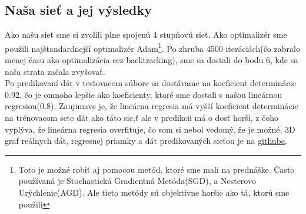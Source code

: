 \documentclass{article}
\begin{document}
\subsection{Naša sieť a jej výsledky}
Ako našu sieť sme si zvolili plne spojenú 4 stupňovú sieť. Ako optimalizér sme použili najštandardnejší optimalizér Adam\footnote{Toto je možné robiť aj pomocou metód, ktoré sme mali na prednáške. Často používaná je Stochastická Gradientná Metóda(SGD), a Nesterovo Urýchlenie(AGD). Ale tieto metódy sú objektívne horšie ako tá, ktorú sme použili}. Po zhruba 4500 iteráciách(čo zabralo menej času ako optimalizácia cez backtracking), sme sa dostali do bodu 6, kde sa naša strata začala zvyšovať.\\
Po predikovaní dát v testovacom súbore sa dostávame na koeficient determinácie 0.92, čo je omnoho lepšie ako koeficienty, ktoré sme dostali s našou lineárnou regresiou(0.8). Zaujimave je, že lineárna regresia má vyšší koeficient determinácie na trénovacom sete dát ako táto sie,ť ale v predikcii má o dosť horší, z čoho vyplýva, že lineárna regresia overfituje, čo som si nebol vedomý, že je možné.
3D graf reálnych dát, regresnej priamky a dát predikovaných sieťou je na \href{https://adam-213.github.io/MVO2022/}{githube}.
\end{document}
